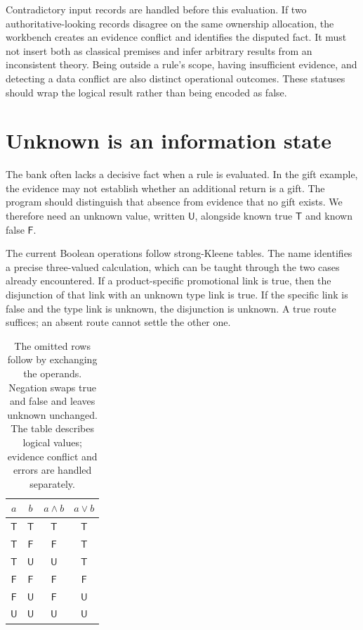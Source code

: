 \documentclass[12pt,a4paper,oneside,openany]{book}
\newcommand{\True}{\mathsf{T}}
\newcommand{\False}{\mathsf{F}}
\newcommand{\Unknown}{\mathsf{U}}
\begin{document}
Contradictory input records are handled before this evaluation. If two
authoritative-looking records disagree on the same ownership allocation, the
workbench creates an evidence conflict and identifies the disputed fact. It must
not insert both as classical premises and infer arbitrary results from an
inconsistent theory. Being outside a rule's scope, having insufficient evidence,
and detecting a data conflict are also distinct operational outcomes. These
statuses should wrap the logical result rather than being encoded as false.

\section{Unknown is an information state}
\label{merge:M03:05}

\label{sec:proof-unknown}
The bank often lacks a decisive fact when a rule is evaluated. In the gift
example, the evidence may not establish whether an additional return is a gift.
The program should distinguish that absence from evidence that no gift exists.
We therefore need an unknown value, written $\Unknown$, alongside known true
$\True$ and known false $\False$.

The current Boolean operations follow strong-Kleene tables. The name identifies
a precise three-valued calculation, which can be taught through the two cases
already encountered. If a product-specific promotional link is true, then the
disjunction of that link with an unknown type link is true. If the specific
link is false and the type link is unknown, the disjunction is unknown. A true
route suffices; an absent route cannot settle the other one.

\begin{table}[htbp]
\centering
\begin{tabular}{cc|cc}
\toprule
$a$ & $b$ & $a\land b$ & $a\lor b$\\
\midrule
$\True$ & $\True$ & $\True$ & $\True$\\
$\True$ & $\False$ & $\False$ & $\True$\\
$\True$ & $\Unknown$ & $\Unknown$ & $\True$\\
$\False$ & $\False$ & $\False$ & $\False$\\
$\False$ & $\Unknown$ & $\False$ & $\Unknown$\\
$\Unknown$ & $\Unknown$ & $\Unknown$ & $\Unknown$\\
\bottomrule
\end{tabular}
\caption{The omitted rows follow by exchanging the operands. Negation swaps
true and false and leaves unknown unchanged. The table describes logical values;
evidence conflict and errors are handled separately.}
\label{tab:kleene}
\end{table}
\end{document}
